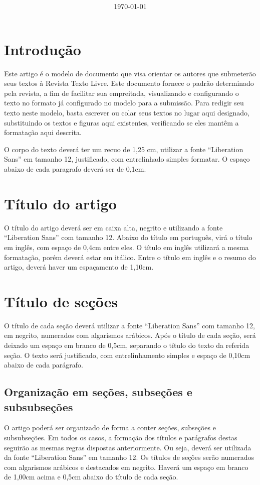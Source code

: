 \documentclass[red]{textolivre}
\title{%
    \vspace{-15mm}%
    \selectfont\textbf{\MakeUppercase{\tituloportugues}} \\
    \vspace{2.1mm}
    \selectfont\textbf{\textit{{\MakeUppercase{\tituloingles}}}}%
}
\date{\today}
\begin{document}
\maketitle

\section{Introdução}
Este artigo é o modelo de documento que visa orientar os autores que submeterão seus textos à Revista Texto Livre. Este documento fornece o padrão determinado pela revista, a fim de facilitar sua empreitada, visualizando e configurando o texto no formato já configurado no modelo para a submissão. Para redigir seu texto neste modelo, basta escrever ou colar seus textos no lugar aqui designado, substituindo os textos e figuras aqui existentes, verificando se eles mantêm a formatação aqui descrita.

O corpo do texto deverá ter um recuo de 1,25 cm, utilizar a fonte “Liberation Sans” em tamanho 12, justificado, com entrelinhado simples formatar. O espaço abaixo de cada paragrafo deverá ser de 0,1cm.

\section{Título do artigo}
O título do artigo deverá ser em caixa alta, negrito e utilizando a fonte “Liberation Sans” com tamanho 12. Abaixo do título em português, virá o título em inglês, com espaço de 0,4cm entre eles. O título em inglês utilizará a mesma formatação, porém deverá estar em itálico. Entre o título em inglês e o resumo do artigo, deverá haver um espaçamento de 1,10cm.

\section{Título de seções}
O título de cada seção deverá utilizar a fonte “Liberation Sans” com tamanho 12, em negrito, numerados com algarismos arábicos. Após o título de cada seção, será deixado um espaço em branco de 0,5cm, separando o título do texto da referida seção. O texto será justificado, com entrelinhamento simples e espaço de 0,10cm abaixo de cada parágrafo.

\subsection{Organização em seções, subseções e subsubseções}
O artigo poderá ser organizado de forma a conter seções, subseções e subsubseções. Em todos os casos, a formação dos títulos e parágrafos destas seguirão as mesmas regras dispostas anteriormente. Ou seja, deverá ser utilizada da fonte “Liberation Sans” em tamanho 12. Os títulos de seções serão numerados com algarismos arábicos e destacados em negrito. Haverá um espaço em branco de 1,00cm acima e 0,5cm abaixo do título de cada seção.
\end{document}
